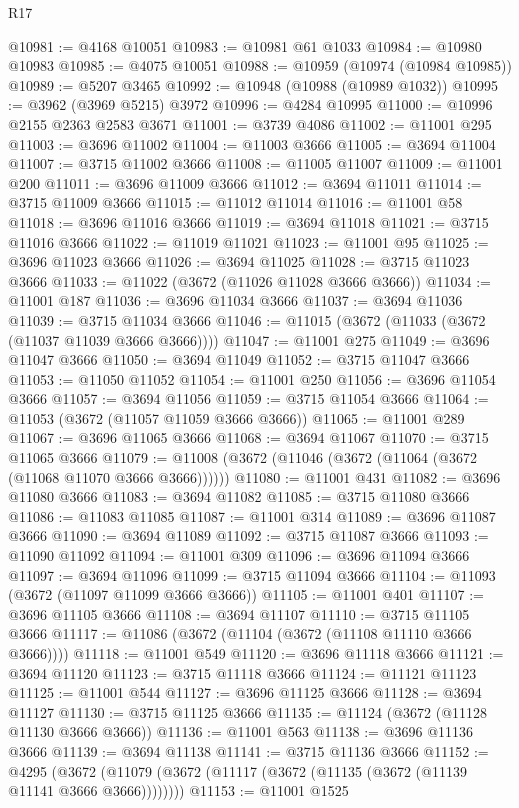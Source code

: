 \begin{lexlean}{R17}
\begin{coremodule}
@10981 := @4168 @10051
@10983 := @10981 @61 @1033
@10984 := @10980 @10983
@10985 := @4075 @10051
@10988 := @10959 (@10974 (@10984 @10985))
@10989 := @5207 @3465
@10992 := @10948 (@10988 (@10989 @1032))
@10995 := @3962 (@3969 @5215) @3972
@10996 := @4284 @10995
@11000 := @10996 @2155 @2363 @2583 @3671
@11001 := @3739 @4086
@11002 := @11001 @295
@11003 := @3696 @11002
@11004 := @11003 @3666
@11005 := @3694 @11004
@11007 := @3715 @11002 @3666
@11008 := @11005 @11007
@11009 := @11001 @200
@11011 := @3696 @11009 @3666
@11012 := @3694 @11011
@11014 := @3715 @11009 @3666
@11015 := @11012 @11014
@11016 := @11001 @58
@11018 := @3696 @11016 @3666
@11019 := @3694 @11018
@11021 := @3715 @11016 @3666
@11022 := @11019 @11021
@11023 := @11001 @95
@11025 := @3696 @11023 @3666
@11026 := @3694 @11025
@11028 := @3715 @11023 @3666
@11033 := @11022 (@3672 (@11026 @11028 @3666 @3666))
@11034 := @11001 @187
@11036 := @3696 @11034 @3666
@11037 := @3694 @11036
@11039 := @3715 @11034 @3666
@11046 := @11015 (@3672 (@11033 (@3672 (@11037 @11039 @3666 @3666))))
@11047 := @11001 @275
@11049 := @3696 @11047 @3666
@11050 := @3694 @11049
@11052 := @3715 @11047 @3666
@11053 := @11050 @11052
@11054 := @11001 @250
@11056 := @3696 @11054 @3666
@11057 := @3694 @11056
@11059 := @3715 @11054 @3666
@11064 := @11053 (@3672 (@11057 @11059 @3666 @3666))
@11065 := @11001 @289
@11067 := @3696 @11065 @3666
@11068 := @3694 @11067
@11070 := @3715 @11065 @3666
@11079 := @11008 (@3672 (@11046 (@3672 (@11064 (@3672 (@11068 @11070 @3666 @3666))))))
@11080 := @11001 @431
@11082 := @3696 @11080 @3666
@11083 := @3694 @11082
@11085 := @3715 @11080 @3666
@11086 := @11083 @11085
@11087 := @11001 @314
@11089 := @3696 @11087 @3666
@11090 := @3694 @11089
@11092 := @3715 @11087 @3666
@11093 := @11090 @11092
@11094 := @11001 @309
@11096 := @3696 @11094 @3666
@11097 := @3694 @11096
@11099 := @3715 @11094 @3666
@11104 := @11093 (@3672 (@11097 @11099 @3666 @3666))
@11105 := @11001 @401
@11107 := @3696 @11105 @3666
@11108 := @3694 @11107
@11110 := @3715 @11105 @3666
@11117 := @11086 (@3672 (@11104 (@3672 (@11108 @11110 @3666 @3666))))
@11118 := @11001 @549
@11120 := @3696 @11118 @3666
@11121 := @3694 @11120
@11123 := @3715 @11118 @3666
@11124 := @11121 @11123
@11125 := @11001 @544
@11127 := @3696 @11125 @3666
@11128 := @3694 @11127
@11130 := @3715 @11125 @3666
@11135 := @11124 (@3672 (@11128 @11130 @3666 @3666))
@11136 := @11001 @563
@11138 := @3696 @11136 @3666
@11139 := @3694 @11138
@11141 := @3715 @11136 @3666
@11152 := @4295
    (@3672 (@11079 (@3672 (@11117 (@3672 (@11135 (@3672 (@11139 @11141 @3666 @3666))))))))
@11153 := @11001 @1525

\end{coremodule}
\end{lexlean}
